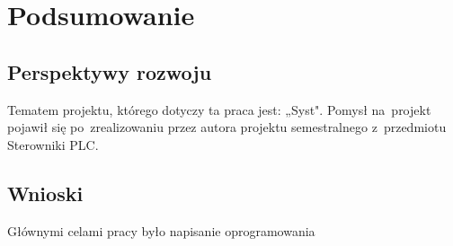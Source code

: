 \section{Podsumowanie}

\subsection{Perspektywy rozwoju}
Tematem projektu, którego dotyczy ta praca jest: „Syst". Pomysł na~projekt pojawił się po~zrealizowaniu przez autora projektu semestralnego z~przedmiotu Sterowniki PLC.

\subsection{Wnioski}
Głównymi celami pracy było napisanie oprogramowania